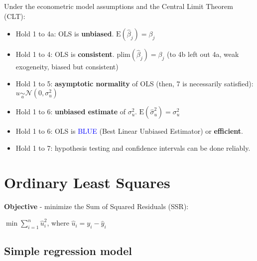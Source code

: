 \documentclass[10pt, a4paper, landscape]{extarticle}
\newcommand{\E}{\mathrm{E}}
\begin{document}
\begin{multicols}{3}
Under the econometric model assumptions and the Central Limit Theorem (CLT):

\begin{itemize}[leftmargin=*]
	\item Hold 1 to 4a: OLS is \textbf{unbiased}. $\E(\hat{\beta}_j) = \beta_j$
	\item Hold 1 to 4: OLS is \textbf{consistent}. $\mathrm{plim}(\hat{\beta}_j) = \beta_j$ (to 4b left out 4a, weak exogeneity, biased but consistent)
	\item Hold 1 to 5: \textbf{asymptotic normality} of OLS (then, 7 is necessarily satisfied): $u \underset{a}{\sim} \mathcal{N} (0, \sigma^2_u)$
	\item Hold 1 to 6: \textbf{unbiased estimate} of $\sigma^2_u$. $\E(\hat{\sigma}^2_u) = \sigma^2_u$
	\item Hold 1 to 6: OLS is \textcolor{blue}{BLUE} (Best Linear Unbiased Estimator) or \textbf{efficient}. 
	\item Hold 1 to 7: hypothesis testing and confidence intervals can be done reliably.
\end{itemize}

\section*{Ordinary Least Squares}

\textbf{Objective} - minimize the Sum of Squared Residuals (SSR):

\begin{center}
	$\min \sum_{i=1}^n \hat{u}_i^2$, where $\hat{u}_i = y_i - \hat{y}_i$
\end{center}

\subsection*{Simple regression model}

\setlength{\multicolsep}{2pt}
\setlength{\columnsep}{-40pt}
\begin{multicols}{2}



\end{multicols}
\end{multicols}
\end{document}
